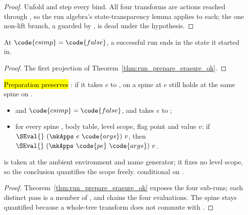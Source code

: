 \begin{proof}
\leanok
{}
 Unfold  and step every bind. All four transforms are 
actions reached through , so the run algebra's state-transparency lemma applies to each; the
one non-lift branch, a  guarded by , is dead under the
hypothesis.
\end{proof}
\begin{lemma}
\label{lem:run_prepare_erasure_state}
\leanok
{}
 At $\code{csimp} = \code{false}$, a successful  run ends in the
state it started in.
\end{lemma}
\begin{proof}
\leanok
{}
 The first projection of Theorem~\ref{thm:run_prepare_erasure_ok}.
\end{proof}
\begin{theorem}
\label{thm:prepare_sound}
\leanok
{}
 \hl{Preparation preserves \SEval{}}: if it takes $e$ to , \SEval{} on a spine
at $e$ still holds at the same spine on .
\begin{itemize}
\item {}  and $\code{csimp} = \code{false}$, and
 takes $e$ to ;
\item {} for every spine , body table, level scope, flag point and value $v$: if
$\SEval{}\ (\mkApps\ e\ \code{args})\ v$, then $\SEval{}\ (\mkApps\ \code{pe}\ \code{args})\ v$.
\end{itemize}
  is taken at the ambient environment and name generator; it fixes no
level scope, so the conclusion quantifies the scope freely.
 \stProved{} conditional on \stAssumed{} .
\end{theorem}
\begin{proof}
\leanok
{}
 Theorem~\ref{thm:run_prepare_erasure_ok} exposes the four sub-runs; each distinct pass is a
member of , and  chains the four evaluations. The
spine stays quantified because a whole-tree transform does not commute with \mkApps{}.
\end{proof}

